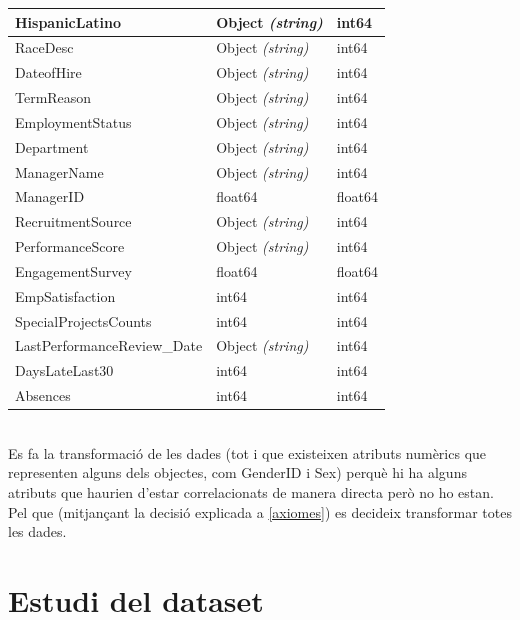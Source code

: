 \documentclass[a4paper, 11pt]{article}
\begin{document}
\begin{table}[h]
\begin{tabular}{l||l|l}
        HispanicLatino & Object \textit{(string)} & int64 \\\hline
        RaceDesc & Object \textit{(string)} & int64 \\\hline
        DateofHire & Object \textit{(string)} & int64 \\\hline
        TermReason & Object \textit{(string)} & int64 \\\hline
        EmploymentStatus & Object \textit{(string)} & int64 \\\hline
        Department & Object \textit{(string)} & int64 \\\hline
        ManagerName & Object \textit{(string)} & int64 \\\hline
        ManagerID & float64 & float64 \\\hline
        RecruitmentSource & Object \textit{(string)} & int64 \\\hline
        PerformanceScore & Object \textit{(string)} & int64 \\\hline
        EngagementSurvey & float64  & float64 \\\hline
        EmpSatisfaction & int64 & int64 \\\hline
        SpecialProjectsCounts & int64  & int64 \\\hline
        LastPerformanceReview\_Date & Object \textit{(string)} & int64 \\\hline
        DaysLateLast30 & int64  & int64\\\hline
        Absences & int64  & int64 \\
    \end{tabular}
    \label{tab:my_label}
\end{table}\\
Es fa la transformació de les dades (tot i que existeixen atributs numèrics que representen alguns dels objectes, com GenderID i Sex) perquè hi ha alguns atributs que haurien d'estar correlacionats de manera directa però no ho estan. Pel que (mitjançant la decisió explicada a \textcolor{navy}{\ref{axiomes}}) es decideix transformar totes les dades.
\newpage
\section{Estudi del dataset}
\end{document}
